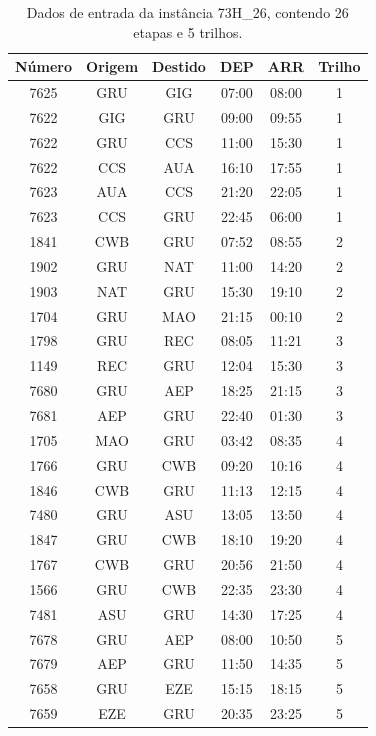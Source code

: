\begin{table}[!htb]
	\begin{center}
		\begin{tabular}{|cccccc|}
			\hline 
			{\bf Número} & {\bf Origem} & {\bf Destido} & {\bf DEP} & {\bf ARR} & {\bf Trilho} \\
			\hline \hline
			7625 & GRU &	GIG	 &  07:00	 &  08:00  & 1 \\
			7622 & GIG &	GRU	 &  09:00	 &  09:55	 & 1 \\
			7622 & GRU &	CCS	 &  11:00	 &  15:30	 & 1 \\
			7622 & CCS &	AUA	 &  16:10	 &  17:55	 & 1 \\
			7623 & AUA &	CCS	 &  21:20	 &  22:05	 & 1 \\
			7623 & CCS &	GRU	 &  22:45	 &  06:00	 & 1 \\
			1841 & CWB &	GRU	 &  07:52	 &  08:55	 & 2 \\
			1902 & GRU &	NAT	 &  11:00	 &  14:20	 & 2 \\
			1903 & NAT &	GRU	 &  15:30	 &  19:10	 & 2 \\
			1704 & GRU &	MAO	 &  21:15	 &  00:10	 & 2 \\
			1798 & GRU &	REC	 &  08:05	 &  11:21	 & 3 \\
			1149 & REC &	GRU	 &  12:04	 &  15:30	 & 3 \\
			7680 & GRU &	AEP	 &  18:25	 &  21:15	 & 3 \\
			7681 & AEP &	GRU	 &  22:40	 &  01:30	 & 3 \\
			1705 & MAO &	GRU	 &  03:42	 &  08:35	 & 4 \\
			1766 & GRU &	CWB	 &  09:20	 &  10:16	 & 4 \\
			1846 & CWB &	GRU	 &  11:13	 &  12:15	 & 4 \\
			7480 & GRU &	ASU	 &  13:05	 &  13:50	 & 4 \\
			1847 & GRU &	CWB	 &  18:10	 &  19:20	 & 4 \\
			1767 & CWB &	GRU	 &  20:56	 &  21:50	 & 4 \\
			1566 & GRU &	CWB	 &  22:35	 &  23:30	 & 4 \\
			7481 & ASU &	GRU	 &  14:30	 &  17:25	 & 4 \\
			7678 & GRU &	AEP	 &  08:00	 &  10:50	 & 5 \\
			7679 & AEP &	GRU	 &  11:50	 &  14:35	 & 5 \\
			7658 & GRU &	EZE	 &  15:15	 &  18:15	 & 5 \\
			7659 & EZE &	GRU	 &  20:35	 &  23:25	 & 5 \\ \hline
	\end{tabular}
	\caption{Dados de entrada da instância 73H\_26, contendo 26 etapas e 5 trilhos.}
	\label{tab:73H_26}
	\end{center}
\end{table}

